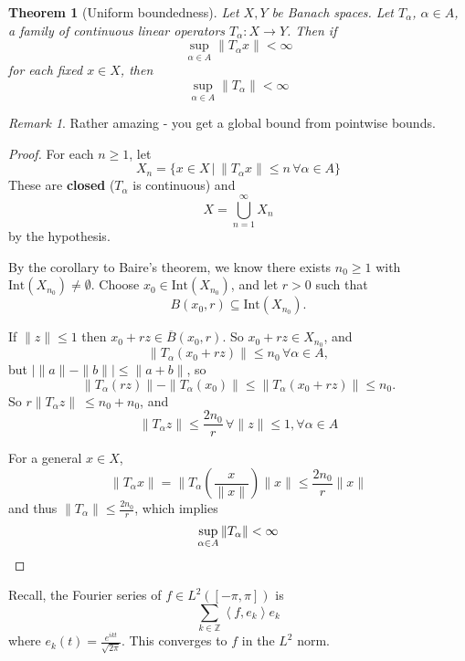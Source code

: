 \documentclass[10pt, oneside, reqno]{amsbook}
\theoremstyle{plain}%
\newtheorem{thm}{Theorem}[section]
\theoremstyle{definition}
\theoremstyle{remark}
\newtheorem*{rem}{Remark}
\newcommand{\given}{ \, | \,}
\newcommand{\Z}{\mathbb{Z}}
\newcommand{\iprod}[1]{\left\langle #1 \right\rangle}
\begin{document}
\begin{thm}[Uniform boundedness]
    Let $X, Y$ be Banach spaces.  Let $T_\alpha$, $\alpha \in A$, a family of continuous linear operators $T_\alpha : X \rightarrow Y$.  Then if \[
        \sup_{\alpha \in A} \| T_\alpha x \| < \infty
    \] for each fixed $x \in X$, then \[
        \sup_{\alpha \in A} \| T_\alpha \| < \infty
    \]
\end{thm}
\begin{rem}
    Rather amazing - you get a global bound from pointwise bounds.
\end{rem}
\begin{proof}
    For each $n \geq 1$, let \[
        X_n = \{ x \in X \given \| T_\alpha x \| \leq n \, \forall \alpha \in A \}
    \]  These are \textbf{closed} ($T_{\alpha}$ is continuous) and \[
        X = \bigcup_{n=1}^\infty X_n
    \] by the hypothesis.
    
    By the corollary to Baire's theorem, we know there exists $n_0 \geq 1$ with $\text{Int}(X_{n_0}) \neq \emptyset$.  Choose $x_0 \in \text{Int}(X_{n_0})$, and let $r > 0$ such that \[
        B(x_0, r) \subseteq \text{Int}(X_{n_0}).  
    \]  
    
    If $\| z \| \leq 1$ then $x_0 + rz \in \overline B (x_0, r)$. So $x_0 + rz \in X_{n_0}$, and \[
        \| T_\alpha(x_0 + rz) \| \leq n_0 \, \forall \alpha \in A,
    \]  but $| \| a \| - \| b \| | \leq \| a + b \|$, so \[
        \| T_\alpha (rz) \| - \| T_\alpha (x_0) \| \leq \| T_\alpha (x_0 + rz) \| \leq n_0.
    \]
    So $r \| T_\alpha z \| \ \leq n_0 + n_0$, and \[
        \| T_\alpha z \| \leq \frac{2 n_0}{r} \, \forall \| z \| \leq 1, \forall \alpha \in A
    \]
    
    For a general $x \in X$, \[
        \| T_\alpha x \| = \| T_\alpha ( \frac{x}{\| x \|}) \| x \| \leq \frac{2 n_0}{r} \| x \|
    \] and thus $\|T_\alpha \| \leq \frac{2 n_0}{r}$, which implies \[
        \sup_{\alpha \in A} \| T_\alpha \| < \infty \qedhere
    \]
    
    
\end{proof}


Recall, the Fourier series of $f \in L^2([-\pi, \pi])$ is \[
    \sum_{k \in \Z} \iprod{f, e_k} e_k
\] where $e_k(t) = \frac{e^{ikt}}{\sqrt{2 \pi}}$.  This converges to $f$ in the $L^2$ norm.
\end{document}
